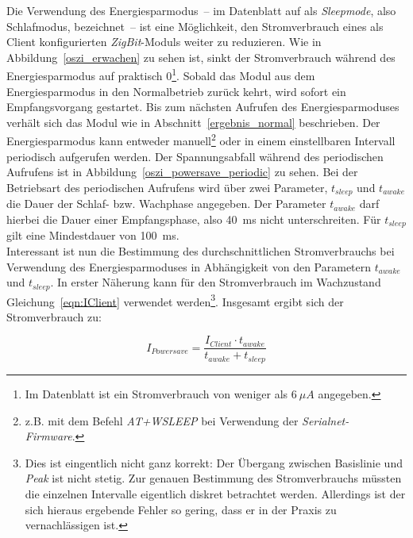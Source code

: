 Die Verwendung des Energiesparmodus~-- im Datenblatt auf als \emph{Sleepmode}, also Schlafmodus, bezeichnet~-- ist eine
Möglichkeit, den Stromverbrauch eines als Client konfigurierten \emph{ZigBit}-Moduls weiter zu reduzieren. Wie in 
Abbildung~\ref{oszi_erwachen} zu sehen ist, sinkt der Stromverbrauch während des Energiesparmodus auf praktisch 
0\footnote{Im Datenblatt ist ein Stromverbrauch von weniger als $6~\mu{}A$ angegeben.}. Sobald das Modul aus dem 
Energiesparmodus in den Normalbetrieb zurück kehrt, wird sofort ein Empfangsvorgang gestartet. Bis zum nächsten Aufrufen des 
Energiesparmoduses verhält sich das Modul wie in Abschnitt~\ref{ergebnis_normal} beschrieben. Der Energiesparmodus kann
entweder manuell\footnote{z.B. mit dem Befehl \emph{AT+WSLEEP} bei Verwendung der \emph{Serialnet-Firmware}.} oder in einem 
einstellbaren Intervall periodisch aufgerufen werden. Der Spannungsabfall während des periodischen Aufrufens ist in
Abbildung~\ref{oszi_powersave_periodic} zu sehen. Bei der Betriebsart des periodischen Aufrufens wird über zwei Parameter,
$t_{sleep}$ und $t_{awake}$ die Dauer der Schlaf- bzw. Wachphase angegeben. Der Parameter $t_{awake}$ darf hierbei die Dauer
einer Empfangsphase, also 40~ms nicht unterschreiten. Für $t_{sleep}$ gilt eine Mindestdauer von 100~ms.\\
Interessant ist nun die Bestimmung des durchschnittlichen Stromverbrauchs bei Verwendung des Energiesparmoduses
in Abhängigkeit von den Parametern $t_{awake}$ und $t_{sleep}$. In erster Näherung kann für den Stromverbrauch im Wachzustand
Gleichung~\ref{eqn:IClient} verwendet werden\footnote{Dies ist eingentlich nicht ganz korrekt: Der Übergang zwischen 
Basislinie und \emph{Peak} ist nicht stetig. Zur genauen Bestimmung des Stromverbrauchs müssten die einzelnen Intervalle 
eigentlich diskret betrachtet werden. Allerdings ist der sich hieraus ergebende Fehler so gering, dass er in der Praxis zu 
vernachlässigen ist.}. Insgesamt ergibt sich der Stromverbrauch zu:

\begin{equation}
   I_{Powersave} = \frac{I_{Client} \cdot t_{awake}}{t_{awake} + t_{sleep}}
\end{equation}

